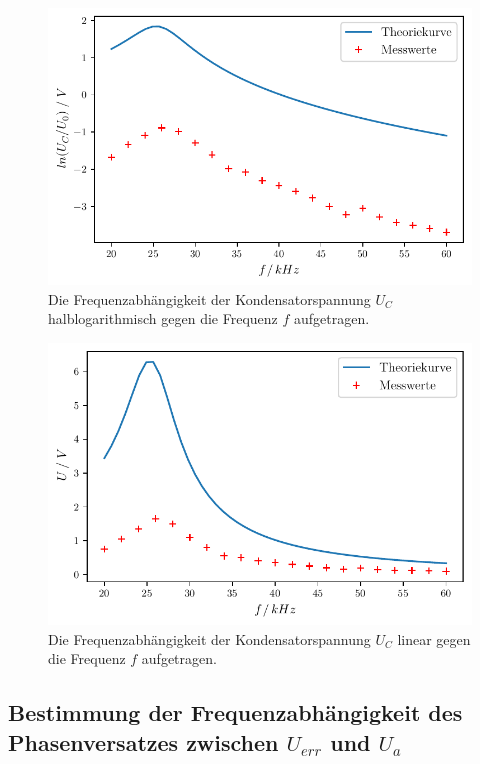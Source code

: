 
\begin{figure}
  \centering
  \includegraphics{build/plotc.pdf}
  \caption{Die Frequenzabhängigkeit der Kondensatorspannung $U_C$ halblogarithmisch gegen die Frequenz $f$ aufgetragen.}
  \label{fig:plotc}
\end{figure}




\begin{figure}
  \centering
  \includegraphics{build/plotc2.pdf}
  \caption{Die Frequenzabhängigkeit der Kondensatorspannung $U_C$ linear gegen die Frequenz $f$ aufgetragen.}
  \label{fig:plotc2}
\end{figure}




\subsection{Bestimmung der Frequenzabhängigkeit des Phasenversatzes zwischen $U_{err}$ und $U_{a}$}
\label{Phasenversatz}


